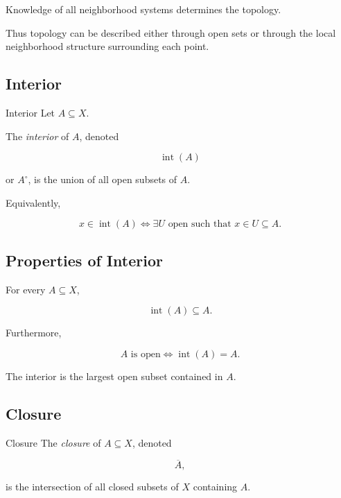 Knowledge of all neighborhood systems determines the topology.

Thus topology can be described either through open sets or through the local
neighborhood structure surrounding each point.

\subsection{Interior}
\label{subsec:topological-interior}

\begin{definitionbox}{Interior}
Let \(A\subseteq X\).

The \emph{interior} of \(A\), denoted

\[
\boxed{
\operatorname{int}(A)
}
\]

or \(A^\circ\), is the union of all open subsets of \(A\).
\end{definitionbox}

Equivalently,

\[
\boxed{
x\in\operatorname{int}(A)
\iff
\exists U\text{ open such that }
x\in U\subseteq A.
}
\]

\subsection{Properties of Interior}
\label{subsec:interior-properties}

For every \(A\subseteq X\),

\[
\boxed{
\operatorname{int}(A)\subseteq A.
}
\]

Furthermore,

\[
\boxed{
A\text{ is open}
\iff
\operatorname{int}(A)=A.
}
\]

The interior is the largest open subset contained in \(A\).

\subsection{Closure}
\label{subsec:topological-closure}

\begin{definitionbox}{Closure}
The \emph{closure} of \(A\subseteq X\), denoted

\[
\boxed{
\overline{A},
}
\]

is the intersection of all closed subsets of \(X\) containing \(A\).
\end{definitionbox}


